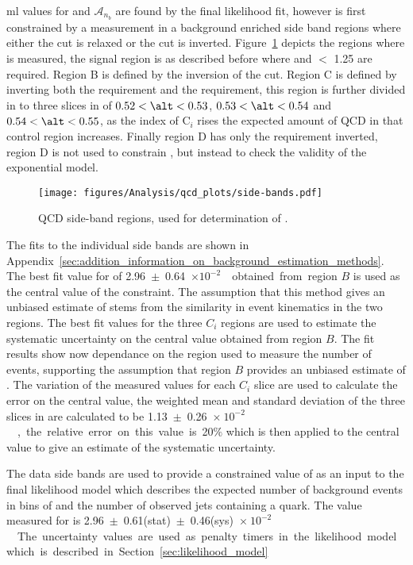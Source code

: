 \ac{ml} values for \kqcd and $\mathcal{A}_{n_{b}}$ are found by the final 
likelihood fit, however \kqcd is first constrained by a measurement in a 
background enriched side band regions where either the \alt cut is relaxed or 
the \Rmiss cut is inverted. Figure~\ref{fig:figures_qcd_side-bands} depicts the 
regions where \kqcd is measured, the signal region is as described before where 
\altg and \Rmiss $<$ 1.25 are required. Region B is defined by the inversion of 
the \alt cut. Region C is defined by inverting both the \alt requirement and 
the \Rmiss requirement, this region is further divided in to three slices in 
\alt of $0.52 < \alt < 0.53$, $0.53 < \alt < 0.54$ and $0.54 < \alt < 0.55$, as 
the index of C$_{i}$ rises the expected amount of QCD in that control region 
increases. Finally region D has only the \Rmiss requirement inverted, region D 
is not used to constrain \kqcd, but instead to check the validity of the 
exponential model.
\begin{figure}[ht]
  \centering
    \texttt{[image: figures/Analysis/qcd\_plots/side-bands.pdf]}
  \caption{QCD side-band regions, used for determination of \kqcd.}
  \label{fig:figures_qcd_side-bands}
\end{figure}
The fits to the individual side bands are shown in 
Appendix~\ref{sec:addition_information_on_background_estimation_methods}.
The best fit value for \kqcd of \unit{2.96~$\pm$~0.64~$\times 
10^{-2}$}{\GinveV} obtained from region $B$ is used as the central value of the 
constraint. The assumption that this method gives an unbiased estimate of \kqcd 
stems from the similarity in event kinematics in the two \alt regions.
The best fit values for the three $C_{i}$ regions are used to estimate the 
systematic uncertainty on the central value obtained from region $B$. The fit 
results show now dependance on the \alt region used to measure the number of 
events, supporting the assumption that region $B$ provides an unbiased estimate 
of \kqcd. The variation of the measured values for each $C_{i}$ slice are used 
to calculate the error on the central value, the weighted mean and standard 
deviation of the three slices in \alt are calculated to be 
\unit{1.13~$\pm$~0.26~$\times~10^{-2}$}{\GinveV}, the relative error on this 
value is 20$\%$ which is then applied to the central value to give an estimate 
of the systematic uncertainty.

The data side bands are used to provide a constrained value of \kqcd as an 
input to the final likelihood model which describes the expected number of 
background events in bins of \HT and the number of observed jets containing a 
\Pbottom quark. The value measured for \kqcd is 
\unit{2.96~$\pm$~0.61(stat)~$\pm$~0.46(sys)~$\times~10^{-2}$}{\GinveV}. The 
uncertainty values are used as penalty timers in the likelihood model which is 
described in Section~\ref{sec:likelihood_model}

